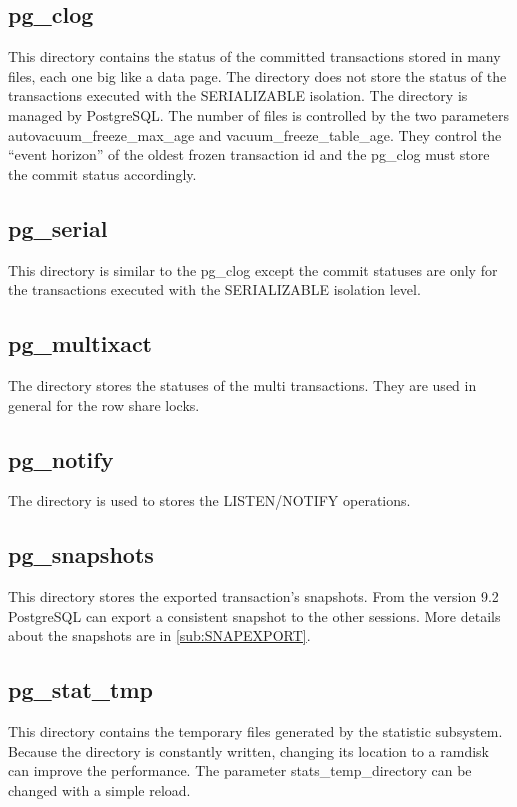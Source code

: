 \subsection{pg\_clog}
This directory contains the status of the committed transactions stored in many files, each one
big like a data page. The directory does not store the status of the transactions executed
with the SERIALIZABLE isolation. The directory is managed by PostgreSQL. The number of files is
controlled by the two parameters autovacuum\_freeze\_max\_age and vacuum\_freeze\_table\_age.
They control the ``event horizon'' of the oldest frozen transaction id and the pg\_clog must
store the commit status accordingly. 

\subsection{pg\_serial}
This directory is similar to the pg\_clog except the commit statuses are only for the transactions
executed with the  SERIALIZABLE isolation level.

\subsection{pg\_multixact}
The directory stores the statuses of the multi transactions. They are used in general for the
row share locks.

\subsection{pg\_notify}
The directory is used to stores the LISTEN/NOTIFY operations.

\subsection{pg\_snapshots}
This directory stores the exported transaction's snapshots. From the version 9.2 PostgreSQL
can export a consistent snapshot to the other sessions. More details about the snapshots are in
\ref{sub:SNAPEXPORT}.


\subsection{pg\_stat\_tmp}
This directory contains the temporary files generated by the statistic subsystem. 
Because the directory is constantly written, changing its location to a ramdisk can improve the
performance. The parameter stats\_temp\_directory can be changed with a simple reload.

